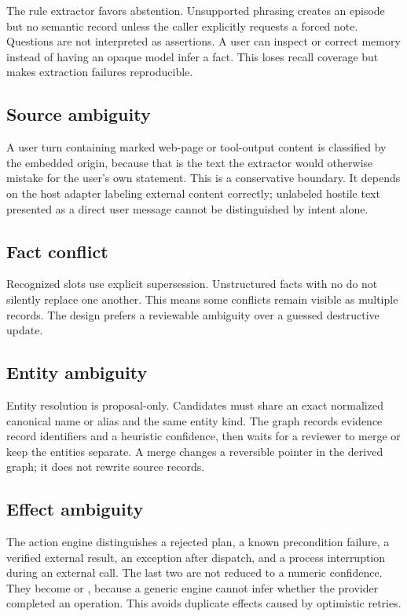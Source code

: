 The rule extractor favors abstention. Unsupported phrasing creates an episode but no semantic record unless the caller explicitly requests a forced note. Questions are not interpreted as assertions. A user can inspect or correct memory instead of having an opaque model infer a fact. This loses recall coverage but makes extraction failures reproducible.

\subsection{Source ambiguity}

A user turn containing marked web-page or tool-output content is classified by the embedded origin, because that is the text the extractor would otherwise mistake for the user's own statement. This is a conservative boundary. It depends on the host adapter labeling external content correctly; unlabeled hostile text presented as a direct user message cannot be distinguished by intent alone.

\subsection{Fact conflict}

Recognized slots use explicit supersession. Unstructured facts with no  do not silently replace one another. This means some conflicts remain visible as multiple records. The design prefers a reviewable ambiguity over a guessed destructive update.

\subsection{Entity ambiguity}

Entity resolution is proposal-only. Candidates must share an exact normalized canonical name or alias and the same entity kind. The graph records evidence record identifiers and a heuristic confidence, then waits for a reviewer to merge or keep the entities separate. A merge changes a reversible pointer in the derived graph; it does not rewrite source records.

\subsection{Effect ambiguity}

The action engine distinguishes a rejected plan, a known precondition failure, a verified external result, an exception after dispatch, and a process interruption during an external call. The last two are not reduced to a numeric confidence. They become  or , because a generic engine cannot infer whether the provider completed an operation. This avoids duplicate effects caused by optimistic retries.


